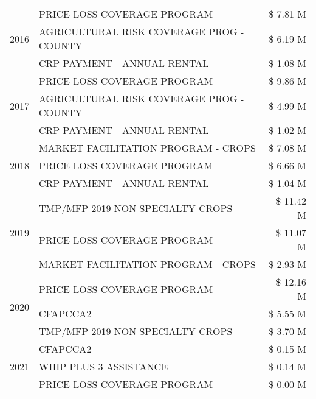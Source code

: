 \begin{tabular}{llr}
\multirow[t]{3}{*}{2016} & PRICE LOSS COVERAGE PROGRAM & \$ 7.81 M \\
 & AGRICULTURAL RISK COVERAGE PROG - COUNTY & \$ 6.19 M \\
 & CRP PAYMENT - ANNUAL RENTAL & \$ 1.08 M \\
\cline{1-3}
\multirow[t]{3}{*}{2017} & PRICE LOSS COVERAGE PROGRAM & \$ 9.86 M \\
 & AGRICULTURAL RISK COVERAGE PROG - COUNTY & \$ 4.99 M \\
 & CRP PAYMENT - ANNUAL RENTAL & \$ 1.02 M \\
\cline{1-3}
\multirow[t]{3}{*}{2018} & MARKET FACILITATION PROGRAM - CROPS & \$ 7.08 M \\
 & PRICE LOSS COVERAGE PROGRAM & \$ 6.66 M \\
 & CRP PAYMENT - ANNUAL RENTAL & \$ 1.04 M \\
\cline{1-3}
\multirow[t]{3}{*}{2019} & TMP/MFP 2019 NON SPECIALTY CROPS & \$ 11.42 M \\
 & PRICE LOSS COVERAGE PROGRAM & \$ 11.07 M \\
 & MARKET FACILITATION PROGRAM - CROPS & \$ 2.93 M \\
\cline{1-3}
\multirow[t]{3}{*}{2020} & PRICE LOSS COVERAGE PROGRAM & \$ 12.16 M \\
 & CFAPCCA2 & \$ 5.55 M \\
 & TMP/MFP 2019 NON SPECIALTY CROPS & \$ 3.70 M \\
\cline{1-3}
\multirow[t]{3}{*}{2021} & CFAPCCA2 & \$ 0.15 M \\
 & WHIP PLUS 3 ASSISTANCE & \$ 0.14 M \\
 & PRICE LOSS COVERAGE PROGRAM & \$ 0.00 M \\
\cline{1-3}
\bottomrule
\end{tabular}
